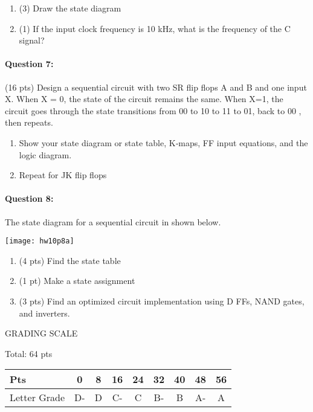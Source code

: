 \documentclass[12pt,letterpaper,titlepage]{report}
\begin{document}
\begin{raggedright}
\begin{enumerate} [noitemsep, label=\alph*)]
\item (3) Draw the state diagram
\item (1) If the input clock frequency is 10 kHz, what is the frequency of the C signal?
\end{enumerate}

\clearpage

\paragraph{Question 7:}
(16 pts) Design a sequential circuit with two SR flip flops A and B and one input X. When X = 0, the state of the circuit remains the same. When X=1, the circuit goes through the state transitions from 00 to 10 to 11 to 01, back to 00 , then repeats.

\begin{enumerate} [noitemsep, label=\alph*)]
\item Show your state diagram or state table, K‐maps, FF input equations, and the logic diagram.
\item Repeat for JK flip flops
\end{enumerate}

\clearpage

\paragraph{Question 8:}
The state diagram for a sequential circuit in shown below. 

\begin{center}
\texttt{[image: hw10p8a]}
\end{center}


\begin{enumerate} [noitemsep, label=\alph*)]
\item (4 pts) Find the state table
\item (1 pt) Make a state assignment
\item (3 pts) Find an optimized circuit implementation using D FFs, NAND gates, and inverters.
\end{enumerate}


\vspace{\fill}
\noindent
GRADING SCALE
\medskip

Total: 64 pts
\bigskip

\def\arraystretch{1.5} 
\begin{tabular}{ | l | c | c | c | c | c | c | c | c | } \hline
Pts          & 0  & 8  & 16 & 24 & 32 & 40 & 48 & 56     \\\hline
Letter Grade & D- & D  & C- & C  & B- & B  & A- & A      \\\hline
\end{tabular}
\end{raggedright}
\end{document}
